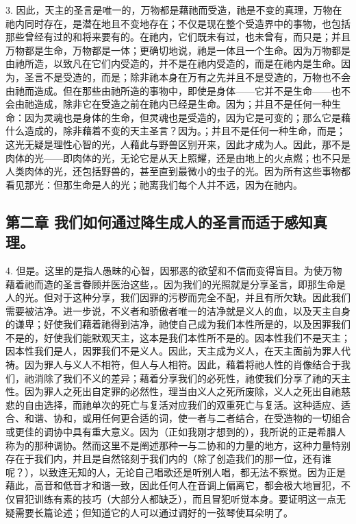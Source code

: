 3. 因此，天主的圣言是唯一的，万物都是藉祂而受造，祂是不变的真理，万物在祂内同时存在，是潜在地且不变地存在；不仅是现在整个受造界中的事物，也包括那些曾经有过的和将来要有的。在祂内，它们既未有过，也未曾有，而只是；并且万物都是生命，万物都是一体；更确切地说，祂是一体且一个生命。因为万物都是由祂所造，以致凡在它们内受造的，并不是在祂内受造的，而是在祂内是生命。因为，圣言不是受造的，而是；除非祂本身在万有之先并且不是受造的，万物也不会由祂而造成。但在那些由祂所造的事物中，即使是身体——它并不是生命——也不会由祂造成，除非它在受造之前在祂内已经是生命。因为；并且不是任何一种生命：因为灵魂也是身体的生命，但灵魂也是受造的，因为它是可变的；那么它是藉什么造成的，除非藉着不变的天主圣言？因为。；并且不是任何一种生命，而是；这光无疑是理性心智的光，人藉此与野兽区别开来，因此才成为人。因此，那不是肉体的光——即肉体的光，无论它是从天上照耀，还是由地上的火点燃；也不只是人类肉体的光，还包括野兽的，甚至直到最微小的虫子的光。因为所有这些事物都看见那光：但那生命是人的光；祂离我们每个人并不远，因为在祂内。\par


\subsection{第二章 我们如何通过降生成人的圣言而适于感知真理。}

4. 但是。这里的是指人愚昧的心智，因邪恶的欲望和不信而变得盲目。为使万物藉着祂而造的圣言眷顾并医治这些，。因为我们的光照就是分享圣言，即那生命是人的光。但对于这种分享，我们因罪的污秽而完全不配，并且有所欠缺。因此我们需要被洁净。进一步说，不义者和骄傲者唯一的洁净就是义人的血，以及天主自身的谦卑；好使我们藉着祂得到洁净，祂使自己成为我们本性所是的，以及因罪我们不是的，好使我们能默观天主，这本是我们本性所不是的。因本性我们不是天主；因本性我们是人，因罪我们不是义人。因此，天主成为义人，在天主面前为罪人代祷。因为罪人与义人不相符，但人与人相符。因此，藉着将祂人性的肖像结合于我们，祂消除了我们不义的差异；藉着分享我们的必死性，祂使我们分享了祂的天主性。因为罪人之死出自定罪的必然性，理当由义人之死所废除，义人之死出自祂慈悲的自由选择，而祂单次的死亡与复活对应我们的双重死亡与复活。这种适应、适合、和谐、协和，或用任何更合适的词，使一者与二者结合，在受造物的一切组合或更佳的调协中具有重大意义。因为（正如我刚才想到的），我所说的正是希腊人称为的那种调协。然而这里不是阐述那种一与二协和的力量的地方，这种力量特别存在于我们内，并且是自然铭刻于我们内的（除了创造我们的那一位，还有谁呢？），以致连无知的人，无论自己唱歌还是听别人唱，都无法不察觉。因为正是藉此，高音和低音才和谐一致，因此任何人在音调上偏离它，都会极大地冒犯，不仅冒犯训练有素的技巧（大部分人都缺乏），而且冒犯听觉本身。要证明这一点无疑需要长篇论述；但知道它的人可以通过调好的一弦琴使耳朵明了。\par

